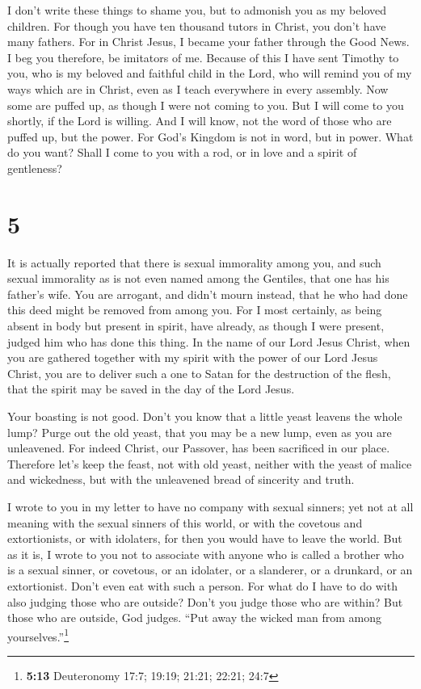  I don't write these things to shame you, but to admonish
you as my beloved children.  For though you have ten
thousand tutors in Christ, you don't have many fathers. For in Christ
Jesus, I became your father through the Good News.  I beg
you therefore, be imitators of me.  Because of this I
have sent Timothy to you, who is my beloved and faithful child in the
Lord, who will remind you of my ways which are in Christ, even as I
teach everywhere in every assembly.  Now some are puffed
up, as though I were not coming to you.  But I will come
to you shortly, if the Lord is willing. And I will know, not the word of
those who are puffed up, but the power.  For God's
Kingdom is not in word, but in power.  What do you want?
Shall I come to you with a rod, or in love and a spirit of gentleness?

\hypertarget{section-4}{%
\section{5}\label{section-4}}

 It is actually reported that there is sexual immorality
among you, and such sexual immorality as is not even named among the
Gentiles, that one has his father's wife.  You are
arrogant, and didn't mourn instead, that he who had done this deed might
be removed from among you.  For I most certainly, as being
absent in body but present in spirit, have already, as though I were
present, judged him who has done this thing.  In the name
of our Lord Jesus Christ, when you are gathered together with my spirit
with the power of our Lord Jesus Christ,  you are to
deliver such a one to Satan for the destruction of the flesh, that the
spirit may be saved in the day of the Lord Jesus.

 Your boasting is not good. Don't you know that a little
yeast leavens the whole lump?  Purge out the old yeast,
that you may be a new lump, even as you are unleavened. For indeed
Christ, our Passover, has been sacrificed in our place. 
Therefore let's keep the feast, not with old yeast, neither with the
yeast of malice and wickedness, but with the unleavened bread of
sincerity and truth.

 I wrote to you in my letter to have no company with
sexual sinners;  yet not at all meaning with the sexual
sinners of this world, or with the covetous and extortionists, or with
idolaters, for then you would have to leave the world. 
But as it is, I wrote to you not to associate with anyone who is called
a brother who is a sexual sinner, or covetous, or an idolater, or a
slanderer, or a drunkard, or an extortionist. Don't even eat with such a
person.  For what do I have to do with also judging those
who are outside? Don't you judge those who are within? 
But those who are outside, God judges. ``Put away the wicked man from
among yourselves.''\footnote{\textbf{5:13} Deuteronomy 17:7; 19:19;
  21:21; 22:21; 24:7}

